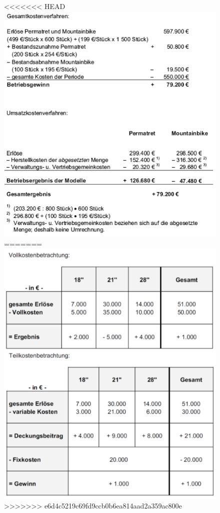 \documentclass[a4paper,11pt, twoside]{article}
\begin{document}
\begin{figure}[h]
 \begin{center}
<<<<<<< HEAD
   \includegraphics[scale=0.5]{bilder/beispiel_betriebsergebnisrechnung2.png}
=======
   \includegraphics[scale=0.5]{bilder/beispiel_vollteilkostenrechnung2.png}
>>>>>>> e6d4c5219c69fd9ccb0b6ea814aad2a359ac800e
 \end{center}
\end{figure}
\end{document}
